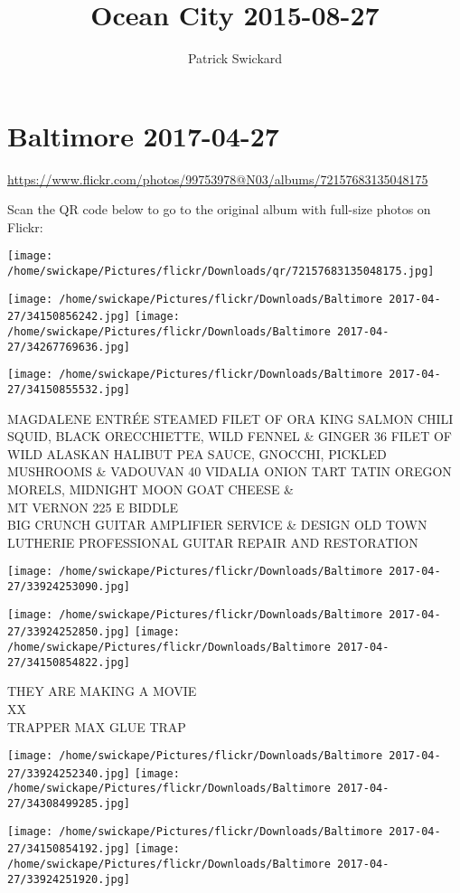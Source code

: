 \documentclass[10pt,letterpaper]{article}
\title{Ocean City 2015-08-27}
\author{Patrick Swickard}
\date{}
\begin{document}
\section*{Baltimore 2017-04-27}

\url{https://www.flickr.com/photos/99753978@N03/albums/72157683135048175}

Scan the QR code below to go to the original album with full-size photos on Flickr:

\texttt{[image: /home/swickape/Pictures/flickr/Downloads/qr/72157683135048175.jpg]}
\pagebreak

\texttt{[image: /home/swickape/Pictures/flickr/Downloads/Baltimore 2017-04-27/34150856242.jpg]}
\texttt{[image: /home/swickape/Pictures/flickr/Downloads/Baltimore 2017-04-27/34267769636.jpg]}

\texttt{[image: /home/swickape/Pictures/flickr/Downloads/Baltimore 2017-04-27/34150855532.jpg]}

MAGDALENE ENTRÉE STEAMED FILET OF ORA KING SALMON CHILI SQUID, BLACK ORECCHIETTE, WILD FENNEL \& GINGER 36 FILET OF WILD ALASKAN HALIBUT PEA SAUCE, GNOCCHI, PICKLED MUSHROOMS \& VADOUVAN 40 VIDALIA ONION TART TATIN OREGON MORELS, MIDNIGHT MOON GOAT CHEESE \&\\
MT VERNON 225 E BIDDLE\\
BIG CRUNCH GUITAR AMPLIFIER SERVICE \& DESIGN OLD TOWN LUTHERIE PROFESSIONAL GUITAR REPAIR AND RESTORATION
\pagebreak

\texttt{[image: /home/swickape/Pictures/flickr/Downloads/Baltimore 2017-04-27/33924253090.jpg]}

\vspace{0.25in}
\texttt{[image: /home/swickape/Pictures/flickr/Downloads/Baltimore 2017-04-27/33924252850.jpg]}
\texttt{[image: /home/swickape/Pictures/flickr/Downloads/Baltimore 2017-04-27/34150854822.jpg]}

THEY ARE MAKING A MOVIE\\
XX\\
TRAPPER MAX GLUE TRAP
\pagebreak

\texttt{[image: /home/swickape/Pictures/flickr/Downloads/Baltimore 2017-04-27/33924252340.jpg]}
\texttt{[image: /home/swickape/Pictures/flickr/Downloads/Baltimore 2017-04-27/34308499285.jpg]}

\texttt{[image: /home/swickape/Pictures/flickr/Downloads/Baltimore 2017-04-27/34150854192.jpg]}
\texttt{[image: /home/swickape/Pictures/flickr/Downloads/Baltimore 2017-04-27/33924251920.jpg]}
\end{document}
